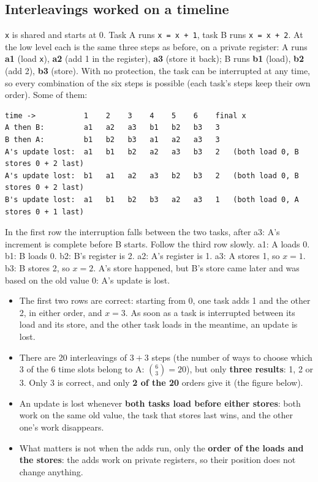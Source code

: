 \subsection{Interleavings worked on a timeline}
\texttt{x} is shared and starts at 0. Task A runs \texttt{x = x + 1}, task B runs \texttt{x = x + 2}. At the low level each is the same three steps as before, on a private register: A runs \textbf{a1} (load \texttt{x}), \textbf{a2} (add 1 in the register), \textbf{a3} (store it back); B runs \textbf{b1} (load), \textbf{b2} (add 2), \textbf{b3} (store). With no protection, the task can be interrupted at any time, so every combination of the six steps is possible (each task's steps keep their own order). Some of them:
{\verbatimscriptsize
\begin{verbatim}
time ->           1    2    3    4    5    6    final x
A then B:         a1   a2   a3   b1   b2   b3   3
B then A:         b1   b2   b3   a1   a2   a3   3
A's update lost:  a1   b1   b2   a2   a3   b3   2   (both load 0, B stores 0 + 2 last)
A's update lost:  b1   a1   a2   a3   b2   b3   2   (both load 0, B stores 0 + 2 last)
B's update lost:  a1   b1   b2   b3   a2   a3   1   (both load 0, A stores 0 + 1 last)
\end{verbatim}}
In the first row the interruption falls between the two tasks, after a3: A's increment is complete before B starts. Follow the third row slowly. a1: A loads 0. b1: B loads 0. b2: B's register is 2. a2: A's register is 1. a3: A stores 1, so $x = 1$. b3: B stores 2, so $x = 2$. A's store happened, but B's store came later and was based on the old value 0: A's update is lost.
\begin{itemize}
    \item The first two rows are correct: starting from 0, one task adds 1 and the other 2, in either order, and $x = 3$. As soon as a task is interrupted between its load and its store, and the other task loads in the meantime, an update is lost.
    \item There are 20 interleavings of $3 + 3$ steps (the number of ways to choose which 3 of the 6 time slots belong to A: $\binom{6}{3} = 20$), but only \textbf{three results}: 1, 2 or 3. Only 3 is correct, and only \textbf{2 of the 20} orders give it (the figure below).
    \item An update is lost whenever \textbf{both tasks load before either stores}: both work on the same old value, the task that stores last wins, and the other one's work disappears.
    \item What matters is not when the adds run, only the \textbf{order of the loads and the stores}: the adds work on private registers, so their position does not change anything.
\end{itemize}
